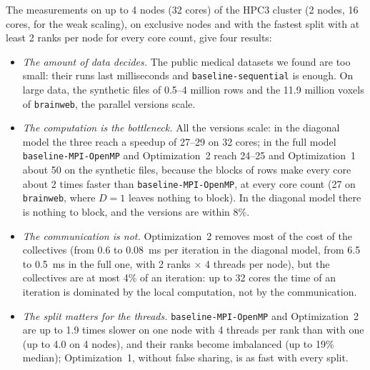 \documentclass[conference,onecolumn]{IEEEtran}
\newcommand{\vseq}{\texttt{baseline-\allowbreak sequential}}
\newcommand{\vbase}{\texttt{baseline-\allowbreak MPI-\allowbreak OpenMP}}
\begin{document}
The measurements on up to 4 nodes (32 cores) of the HPC3 cluster (2 nodes, 16 cores, for the weak scaling), on exclusive nodes and with the fastest split with at least 2 ranks per node for every core count, give four results:
\begin{itemize}
\item \emph{The amount of data decides.} The public medical datasets we found are too small: their runs last milliseconds and \vseq{} is enough. On large data, the synthetic files of 0.5--4 million rows and the 11.9 million voxels of \texttt{brainweb}, the parallel versions scale.
\item \emph{The computation is the bottleneck.} All the versions scale: in the diagonal model the three reach a speedup of 27--29 on 32 cores; in the full model \vbase{} and Optimization~2 reach 24--25 and Optimization~1 about 50 on the synthetic files, because the blocks of rows make every core about 2 times faster than \vbase{}, at every core count (27 on \texttt{brainweb}, where $D=1$ leaves nothing to block). In the diagonal model there is nothing to block, and the versions are within 8\%.
\item \emph{The communication is not.} Optimization~2 removes most of the cost of the collectives (from 0.6 to 0.08~ms per iteration in the diagonal model, from 6.5 to 0.5~ms in the full one, with 2 ranks $\times$ 4 threads per node), but the collectives are at most 4\% of an iteration: up to 32 cores the time of an iteration is dominated by the local computation, not by the communication.
\item \emph{The split matters for the threads.} \vbase{} and Optimization~2 are up to 1.9 times slower on one node with 4 threads per rank than with one (up to 4.0 on 4 nodes), and their ranks become imbalanced (up to 19\% median); Optimization~1, without false sharing, is as fast with every split.
\end{itemize}
\end{document}
